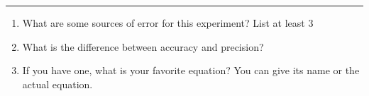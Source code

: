 \documentclass[11pt]{article}
\begin{document}
\Large

\medskip\hrule\bigskip\bigskip
{}
\begin{enumerate}

\item What are some sources of error for this experiment? List at least 3
  \vspace*{0.28\textheight}
\item What is the difference between accuracy and precision?
  \vspace*{0.28\textheight}
\item If you have one, what is your favorite equation? You can give its name or the actual equation.
  
\end{enumerate}
\end{document}

